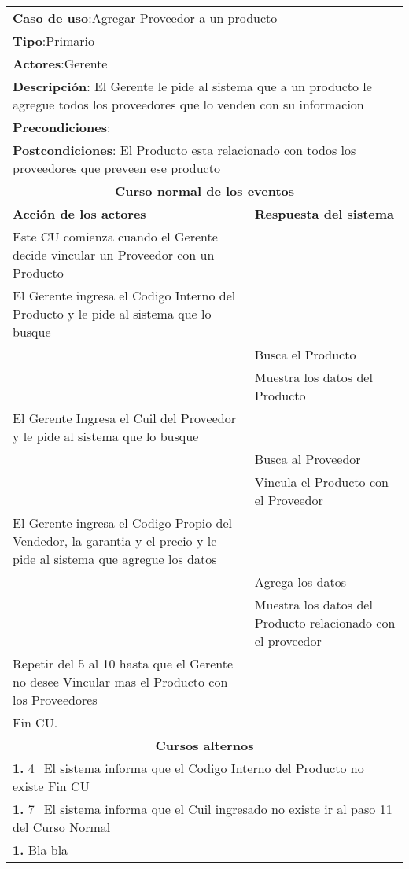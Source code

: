\begin{longtable}{ |p{8cm}|p{8cm}| }
		\hline
		\multicolumn{2}{|p{16cm}|}{\textbf{Caso de uso}:Agregar Proveedor a un producto }\\
		\multicolumn{2}{|p{16cm}|}{\textbf{Tipo}:Primario }\\
		\multicolumn{2}{|p{16cm}|}{\textbf{Actores}:Gerente }\\
		\multicolumn{2}{|p{16cm}|}{\textbf{Descripción}: El Gerente le pide al sistema que a un producto le agregue todos los proveedores que lo venden con su informacion }\\
		\multicolumn{2}{|p{16cm}|}{\textbf{Precondiciones}: }\\
		\multicolumn{2}{|p{16cm}|}{\textbf{Postcondiciones}: El Producto esta relacionado con todos los proveedores que preveen ese producto  }\\
		\hline
		\multicolumn{2}{|c|}{\textbf{Curso normal de los eventos}}\\
		\hline
		\textbf{Acción de los actores} & \textbf{Respuesta del sistema}\\
		\hline
			\inc Este CU comienza cuando el Gerente decide vincular un Proveedor con un Producto & \\
			\hline
			\inc El Gerente ingresa el Codigo Interno del Producto y le pide al sistema que lo busque &   \\
			\hline
			& \inc Busca el Producto \\
			\hline
			& \inc Muestra los datos del Producto \\
			\hline
			\inc El Gerente Ingresa el Cuil del Proveedor y le pide al sistema que lo busque &  \\
			\hline
			& \inc Busca al Proveedor \\
			\hline
			& \inc Vincula el Producto con el Proveedor \\
			\hline
			\inc El Gerente ingresa el Codigo Propio del Vendedor, la garantia y el precio y le pide al sistema que agregue los datos &   \\
			\hline
			& \inc Agrega los datos  \\
			\hline
			& \inc Muestra los datos del Producto relacionado con el proveedor  \\
			\hline
			\inc Repetir del 5 al 10 hasta que el Gerente no desee Vincular mas el Producto con los Proveedores &   \\
			\hline
			\inc Fin CU. & \\
		\hline
		\multicolumn{2}{|c|}{\textbf{Cursos alternos}}\\
		\hline
		\multicolumn{2}{|p{16cm}|}{\textbf{1. }4_El sistema informa que el Codigo Interno del Producto no existe Fin CU }\\
		\hline
		\multicolumn{2}{|p{16cm}|}{\textbf{1. }7_El sistema informa que el Cuil ingresado no existe ir al paso 11 del Curso Normal }\\
		\hline
		\multicolumn{2}{|p{16cm}|}{\textbf{1. }Bla bla }\\
		\hline	
	\end{longtable}
